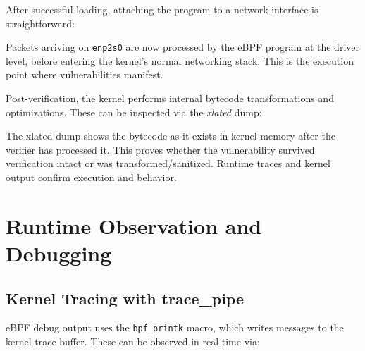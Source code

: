After successful loading, attaching the program to a network interface is straightforward:

\vspace{0.3cm}
\noindent
{}
\vspace{0.3cm}

\noindent
Packets arriving on \texttt{enp2s0} are now processed by the eBPF program at the driver level, before entering the kernel's normal networking stack. This is the execution point where vulnerabilities manifest.

Post-verification, the kernel performs internal bytecode transformations and optimizations. These can be inspected via the \textit{xlated} dump:

\vspace{0.3cm}
\noindent
{}
\vspace{0.3cm}

\noindent
The xlated dump shows the bytecode as it exists in kernel memory after the verifier has processed it. This proves whether the vulnerability survived verification intact or was transformed/sanitized. Runtime traces and kernel output confirm execution and behavior.

\section{Runtime Observation and Debugging}

\subsection{Kernel Tracing with trace\_pipe}

eBPF debug output uses the \texttt{bpf\_printk} macro, which writes messages to the kernel trace buffer. These can be observed in real-time via:

\vspace{0.3cm}
\noindent
{}
\vspace{0.3cm}

